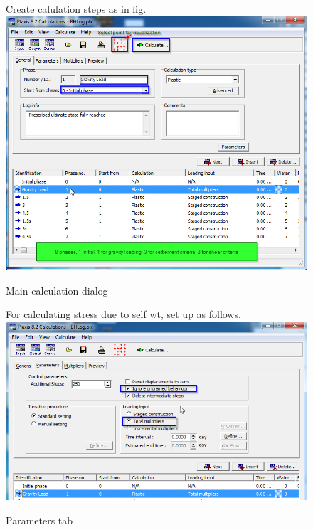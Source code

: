 \begin{figure}[hbtp]
  \vfill
  \centering
  Create calulation steps as in fig.
  \includegraphics[height=0.4\textheight]{images/plx/a (13).png}
  \caption{Main calculation dialog}
  \vfill
  For calculating stress due to self wt, set up as follows.
  \includegraphics[height=0.4\textheight]{images/plx/a (14).png}
  \caption{Parameters tab}
  \vfill
\end{figure}
\pagebreak

